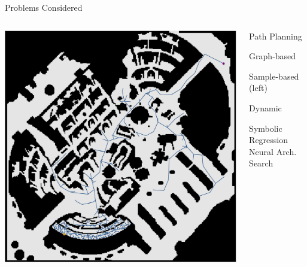 \documentclass[aspectratio=169]{beamer}
\begin{document}
\begin{frame}[plain]{Problems Considered}
  \begin{columns}[T]
      \begin{column}{.5\linewidth}
          \includegraphics[width=1.0\linewidth, keepaspectratio]{figures/baldurs_rrt_one_off.pdf}
      \end{column}
      \begin{column}{.5\linewidth}
          {\Huge Path Planning}
          \begin{vfilleditems}
              \item {\Large Graph-based}
              \vspace{1em}
              \item {\Large Sample-based \Medium (left)}
              \vspace{1em}
              \item {\color{grey} {\Large Dynamic}}
          \end{vfilleditems}
          \vspace{1em}
          {\color{grey} {\Large Symbolic Regression}}
          \vspace{1em}
          {\color{grey} {\Large Neural Arch. Search}}
      \end{column}
  \end{columns}
\end{frame}
\end{document}
